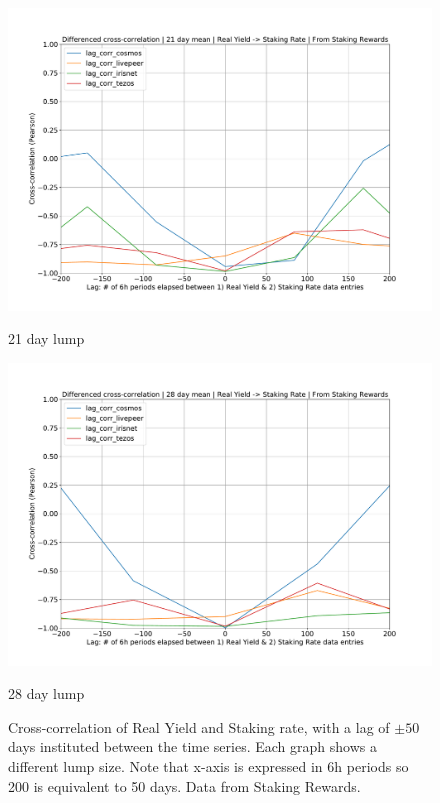 \documentclass[longbibliography,nofootinbib]{revtex4-1}
\begin{document}
\begin{figure}[h!]
\begin{minipage}{0.5\textwidth}
        \includegraphics[width=1\textwidth]{graphs/CrossCorr_SR_DIF_21.pdf}
        \caption{21 day lump}
    \end{minipage}\hfill
    \begin{minipage}{0.5\textwidth}
        \centering
        \includegraphics[width=1\textwidth]{graphs/CrossCorr_SR_DIF_28.pdf}
        \caption{28 day lump}
    \end{minipage}
    \caption{Cross-correlation of Real Yield and Staking rate, with a lag of $\pm50$ days instituted between the time series. Each graph shows a different lump size. Note that x-axis is expressed in 6h periods so 200 is equivalent to 50 days. Data from Staking Rewards.}
\end{figure}
\end{document}
